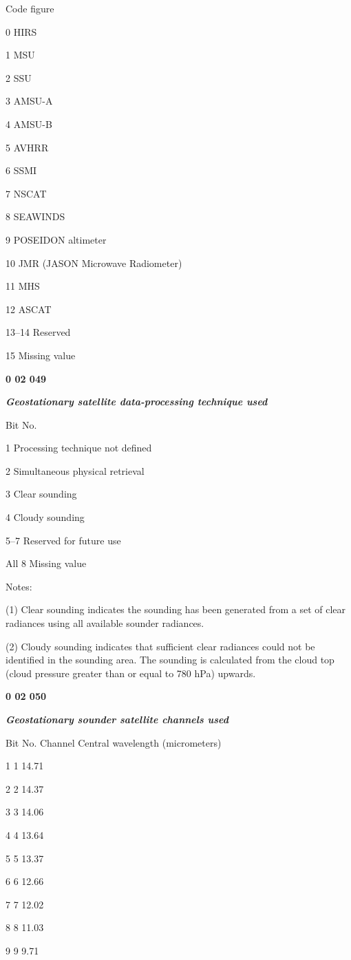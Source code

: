 Code figure

0 HIRS

1 MSU

2 SSU

3 AMSU-A

4 AMSU-B

5 AVHRR

6 SSMI

7 NSCAT

8 SEAWINDS

9 POSEIDON altimeter

10 JMR (JASON Microwave Radiometer)

11 MHS

12 ASCAT

13--14 Reserved

15 Missing value

\textbf{0 02 049}

\emph{\textbf{Geostationary satellite data-processing technique used}}

Bit No.

1 Processing technique not defined

2 Simultaneous physical retrieval

3 Clear sounding

4 Cloudy sounding

5--7 Reserved for future use

All 8 Missing value

Notes:

(1) Clear sounding indicates the sounding has been generated from a set of clear radiances using all available sounder radiances.

(2) Cloudy sounding indicates that sufficient clear radiances could not be identified in the sounding area. The sounding is calculated from the cloud top (cloud pressure greater than or equal to 780 hPa) upwards.

\textbf{0 02 050}

\emph{\textbf{Geostationary sounder satellite channels used}}

Bit No. Channel Central wavelength (micrometers)

1 1 14.71

2 2 14.37

3 3 14.06

4 4 13.64

5 5 13.37

6 6 12.66

7 7 12.02

8 8 11.03

9 9 9.71

